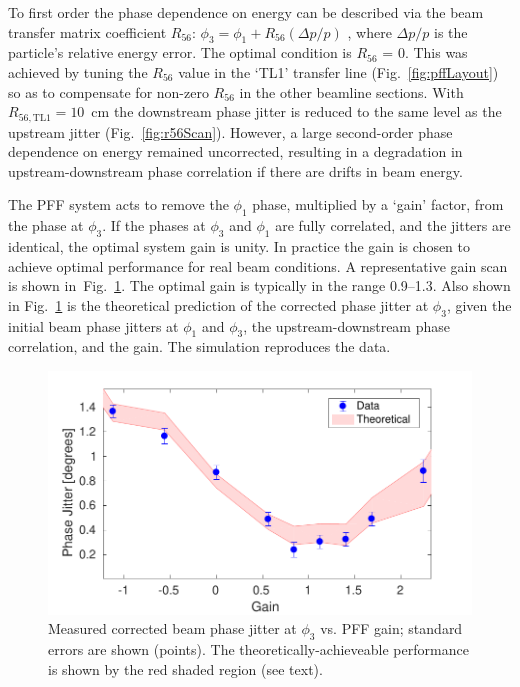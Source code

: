\documentclass[%
 reprint,
 superscriptaddress,
 amsmath,
 amssymb,
 prl,
]{revtex4-1}
\begin{document}
To first order the phase dependence on energy can be described via the beam 
transfer matrix coefficient 
\(R_{56}\): \(\phi_3 = \phi_1 + R_{56}(\Delta p / p)\)
, where \(\Delta p / p\) is the particle's relative energy error.
The optimal condition is \(R_{56}\) = 0.
This was achieved by tuning the \(R_{56}\) value in the `TL1' transfer line 
(Fig.~\ref{fig:pffLayout}) so as to compensate for non-zero \(R_{56}\) in the 
other beamline sections. With \(R_{56, \mathrm{TL1}}=10\)~cm the 
downstream phase jitter is reduced to the same level as the upstream jitter 
(Fig.~\ref{fig:r56Scan}). 
However, a large second-order phase dependence on energy remained uncorrected, 
resulting in a degradation in upstream-downstream phase correlation if there 
are drifts in beam energy.

The PFF system acts to remove the \(\phi_1\) phase, multiplied by a `gain' 
factor, from the phase at \(\phi_3\). If the phases at \(\phi_3\) and 
\(\phi_1\) are fully correlated, and the jitters are identical, the optimal 
system gain is unity.
In practice the gain is chosen to achieve optimal 
performance for real beam conditions. A representative gain scan is shown 
in~Fig.~\ref{fig:gScan}. The optimal gain is typically in the range 
0.9--1.3. Also shown in Fig.~\ref{fig:gScan} is the theoretical prediction of 
the corrected phase jitter at \(\phi_3\), given the initial beam phase jitters 
at \(\phi_1\) and 
\(\phi_3\), the upstream-downstream phase correlation, and the gain. The 
simulation reproduces the data.

\begin{figure}
\includegraphics[width=\columnwidth]{figs/gScan}
\caption{\label{fig:gScan}Measured corrected beam  phase jitter at \(\phi_3\) 
vs. PFF gain; standard errors are shown (points). The theoretically-achieveable 
performance is shown by the red shaded region (see text).}
\end{figure}
\end{document}
